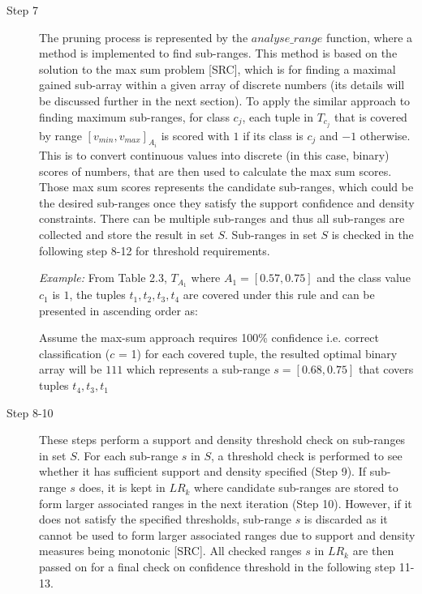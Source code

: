 \begin{description}
\item[Step 7] The pruning process is represented by the $analyse\_range$ function, where a method is implemented to find sub-ranges. This method is based on the solution to the max sum problem [SRC], which is for finding a maximal gained sub-array within a given array of discrete numbers (its details will be discussed further in the next section). To apply the similar approach to finding maximum sub-ranges, for class $c_j$, each tuple in $T_{c_j}$ that is covered by range $[v_{min}, v_{max}]_{A_i}$ is scored with $1$ if its class is $c_j$ and $-1$ otherwise. This is to convert continuous values into discrete (in this case, binary) scores of numbers, that are then used to calculate the max sum scores. Those max sum scores represents the candidate sub-ranges, which could be the desired sub-ranges once they satisfy the support confidence and density constraints. There can be multiple sub-ranges and thus all sub-ranges are collected and store the result in set $S$. Sub-ranges in set $S$ is checked in the following step 8-12 for threshold requirements. 

\textit{Example: } From Table 2.3, $T_{A_1}$ where $A_1 = [0.57, 0.75]$ and the class value $c_1$ is $1$, the tuples ${t_1,t_2,t_3,t_4}$ are covered under this rule and can be presented in ascending order as: 


Assume the max-sum approach requires 100\% confidence i.e. correct classification ($c$ = 1) for each covered tuple, the resulted optimal binary array will be ${ 1 1 1 }$ which represents a sub-range $s = [0.68, 0.75]$ that covers tuples ${t_4,t_3,t_1}$ 

\item[Step 8-10] These steps perform a support and density threshold check on sub-ranges in set $S$. For each sub-range $s$ in $S$, a threshold check is performed to see whether it has sufficient support and density specified (Step 9). If sub-range $s$ does, it is kept in $LR_k$ where candidate sub-ranges are stored to form larger associated ranges in the next iteration (Step 10). However, if it does not satisfy the specified thresholds, sub-range $s$ is discarded as it cannot be used to form larger associated ranges due to support and density measures being monotonic [SRC]. All checked ranges $s$ in $LR_k$ are then passed on for a final check on confidence threshold in the following step 11-13.
 

\end{description}
